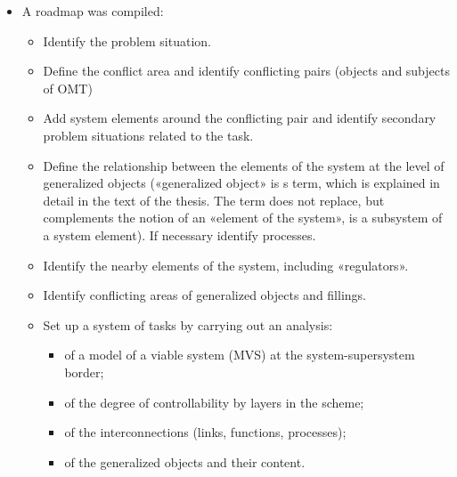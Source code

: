 \documentclass[11pt,a4paper]{book}
\begin{document}
\begin{itemize}
\item A roadmap was compiled:
  \begin{itemize}
  \item Identify the problem situation.
  \item Define the conflict area and identify conflicting pairs (objects and
    subjects of OMT)
  \item Add system elements around the conflicting pair and identify secondary
    problem situations related to the task.
  \item Define the relationship between the elements of the system at the
    level of generalized objects («generalized object» is s term, which is
    explained in detail in the text of the thesis. The term does not replace,
    but complements the notion of an «element of the system», is a subsystem
    of a system element). If necessary identify processes.
  \item Identify the nearby elements of the system, including «regulators».
  \item Identify conflicting areas of generalized objects and fillings.
  \item Set up a system of tasks by carrying out an analysis:
    \begin{itemize}
      \item of a model of a viable system (MVS) at the system-supersystem
        border;
      \item of the degree of controllability by layers in the scheme;
      \item of the interconnections (links, functions, processes);
      \item of the generalized objects and their content.
    \end{itemize}
  \end{itemize}


\end{itemize}
\end{document}
